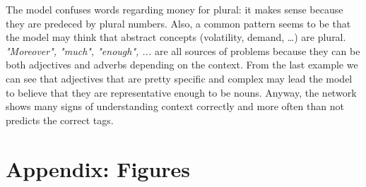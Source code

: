 \documentclass[letterpaper,10.8pt]{article}
\begin{document}
\begin{center}
\end{center}

\begin{center}
\end{center}



The model confuses words regarding money for plural: it makes sense because they are predeced by plural numbers. Also, a common pattern seems to be that the model may think that abstract concepts (volatility, demand, \dots) are plural. \textit{"Moreover", "much", "enough", ...} are all sources of problems because they can be both adjectives and adverbs depending on the context. From the last example we can see that adjectives that are pretty specific and complex may lead the model to believe that they are representative enough to be nouns. Anyway, the network shows many signs of understanding context correctly and more often than not predicts the correct tags.

\newpage

\section{Appendix: Figures}
\end{document}
